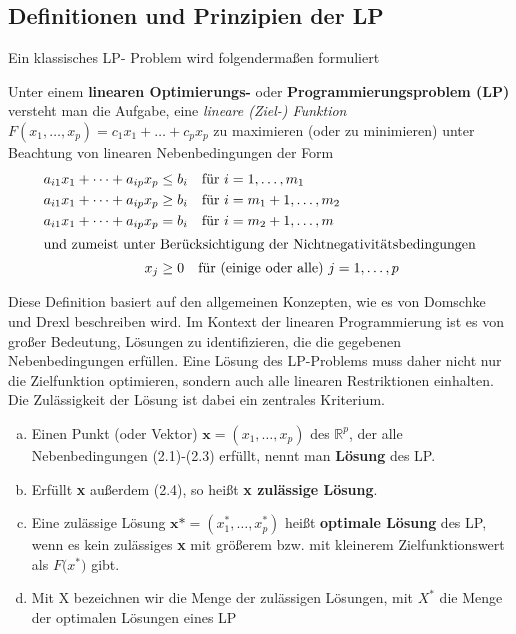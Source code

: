 \documentclass[bachelor, german]{algothesis}
\begin{document}
\subsection{Definitionen und Prinzipien der LP}
Ein klassisches LP- Problem wird folgendermaßen formuliert
\begin{definition}
    Unter einem \textbf{linearen Optimierungs-} oder \textbf{Programmierungsproblem (LP)} versteht man die Aufgabe, eine \textit{lineare (Ziel-) Funktion} $F(x_1,\dots, x_p) = c_1x_1 + \dots + c_px_p$ zu maximieren (oder zu minimieren) unter Beachtung von linearen Nebenbedingungen der Form
    \begin{align}
    a_{i1}x_1 + \dots + a_{ip}x_p &\leq b_i \quad \text{für } i = 1,\dots, m_1 \\
    a_{i1}x_1 + \dots + a_{ip}x_p &\geq b_i \quad \text{für } i = m_1+1,\dots, m_2 \\
    a_{i1}x_1 + \dots + a_{ip}x_p &= b_i \quad \text{für } i = m_2+1,\dots, m \\
    \intertext{und zumeist unter Berücksichtigung der Nichtnegativitätsbedingungen}
    x_j &\geq 0 \quad \text{für (einige oder alle) } j = 1,\dots,p
\end{align}
\end{definition}
Diese Definition basiert auf den allgemeinen Konzepten, wie es von Domschke und Drexl \cite{Operation} beschreiben wird. Im Kontext der linearen Programmierung ist es von großer Bedeutung, Lösungen zu identifizieren, die die gegebenen Nebenbedingungen erfüllen. Eine Lösung des LP-Problems muss daher nicht nur die Zielfunktion optimieren, sondern auch alle linearen Restriktionen einhalten. Die Zulässigkeit der Lösung ist dabei ein zentrales Kriterium. 
\begin{definition}
    \begin{enumerate}[a)]
        \item Einen Punkt (oder Vektor) $\textbf{x} = (x_1,\dots,x_p)$ des $\mathbb{R}^p$, der alle Nebenbedingungen (2.1)-(2.3) erfüllt, nennt man \textbf{Lösung} des LP.
        \item Erfüllt \textbf{x} außerdem (2.4), so heißt \textbf{x zulässige Lösung}.
        \item Eine zulässige Lösung $\textbf{x*} = (x^*_1, \dots, x^*_p)$ heißt \textbf{optimale Lösung} des LP, wenn es kein zulässiges \textbf{x} mit größerem bzw. mit kleinerem Zielfunktionswert als $F($\textbf{$x^*$}$)$ gibt.
        \item Mit X bezeichnen wir die Menge der zulässigen Lösungen, mit $X^*$ die Menge der optimalen Lösungen eines LP
    \end{enumerate}
\end{definition}
\end{document}
